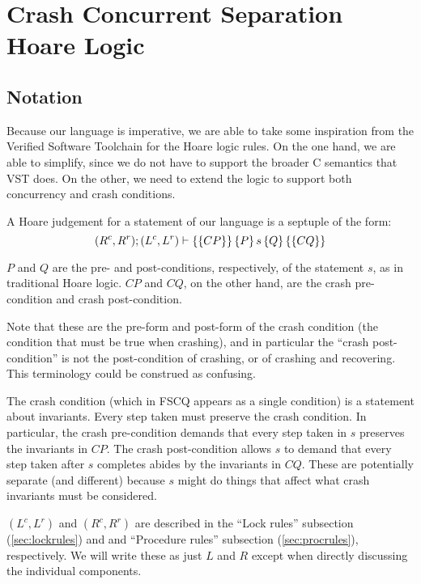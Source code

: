 \section{Crash Concurrent Separation Hoare Logic}
\label{sec:logic}

\subsection{Notation}

Because our language is imperative, we are able to take some inspiration from
the Verified Software Toolchain for the Hoare logic rules.
On the one hand, we
are able to simplify, since we do not have to support the broader C semantics
that VST does.
On the other, we need to extend the logic to support both
concurrency and crash conditions.

A Hoare judgement for a statement of our language is a septuple of the form:
\begin{equation*}
(R^c,R^r); (L^c,L^r) \vdash \left\{\left\{ CP \right\}\right\} \left\{ P \right\} s \left\{ Q \right\} \left\{\left\{ CQ \right\}\right\}
\end{equation*}

$P$ and $Q$ are the pre- and post-conditions, respectively, of the statement
$s$, as in traditional Hoare logic.
$CP$ and $CQ$, on the other hand, are the
crash pre-condition and crash post-condition.

Note that these are the pre-form and post-form of the crash
condition (the condition that must be true when crashing), and in
particular the ``crash post-condition'' is not the post-condition of
crashing, or of crashing and recovering.
This terminology could be construed as confusing.

The crash condition (which in FSCQ appears as a single condition) is a
statement about invariants.
Every step taken must preserve the crash condition.
In particular, the crash pre-condition demands that every step taken
in $s$ preserves the invariants in $CP$.
The crash post-condition allows $s$ to demand that every step taken
after $s$ completes abides by the invariants in $CQ$.
These are potentially separate (and different) because $s$ might do
things that affect what crash invariants must be considered.

$(L^c,L^r)$ and $(R^c,R^r)$ are described in the ``Lock rules'' subsection
(\ref{sec:lockrules}) and and ``Procedure rules'' subsection
(\ref{sec:procrules}), respectively.
We will write these as just $L$ and $R$ except when directly
discussing the individual components.

